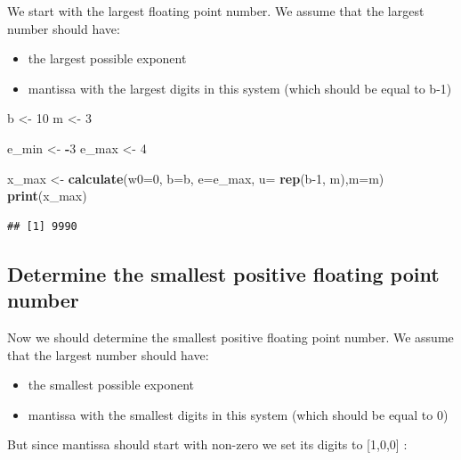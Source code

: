 \documentclass[
]{article}
\newenvironment{Shaded}{\begin{snugshade}}{\end{snugshade}}
\newcommand{\AttributeTok}[1]{\textcolor[rgb]{0.13,0.29,0.53}{#1}}
\newcommand{\DecValTok}[1]{\textcolor[rgb]{0.00,0.00,0.81}{#1}}
\newcommand{\FunctionTok}[1]{\textcolor[rgb]{0.13,0.29,0.53}{\textbf{#1}}}
\newcommand{\NormalTok}[1]{#1}
\newcommand{\OtherTok}[1]{\textcolor[rgb]{0.56,0.35,0.01}{#1}}
\newcommand{\SpecialCharTok}[1]{\textcolor[rgb]{0.81,0.36,0.00}{\textbf{#1}}}
\providecommand{\tightlist}{%
  \setlength{\itemsep}{0pt}\setlength{\parskip}{0pt}}
\begin{document}
We start with the largest floating point number. We assume that the
largest number should have:

\begin{itemize}
\tightlist
\item
  the largest possible exponent
\item
  mantissa with the largest digits in this system (which should be equal
  to b-1)
\end{itemize}

\begin{Shaded}
\begin{Highlighting}[]
\NormalTok{b }\OtherTok{\textless{}{-}} \DecValTok{10}  
\NormalTok{m }\OtherTok{\textless{}{-}} \DecValTok{3}

\NormalTok{e\_min }\OtherTok{\textless{}{-}} \SpecialCharTok{{-}}\DecValTok{3}  
\NormalTok{e\_max }\OtherTok{\textless{}{-}} \DecValTok{4}


\NormalTok{x\_max }\OtherTok{\textless{}{-}} \FunctionTok{calculate}\NormalTok{(}\AttributeTok{w0=}\DecValTok{0}\NormalTok{, }\AttributeTok{b=}\NormalTok{b, }\AttributeTok{e=}\NormalTok{e\_max, }\AttributeTok{u=} \FunctionTok{rep}\NormalTok{(b}\DecValTok{{-}1}\NormalTok{, m),}\AttributeTok{m=}\NormalTok{m)}
\FunctionTok{print}\NormalTok{(x\_max)}
\end{Highlighting}
\end{Shaded}

\begin{verbatim}
## [1] 9990
\end{verbatim}

\subsection{Determine the smallest positive floating point
number}\label{determine-the-smallest-positive-floating-point-number}

Now we should determine the smallest positive floating point number. We
assume that the largest number should have:

\begin{itemize}
\tightlist
\item
  the smallest possible exponent
\item
  mantissa with the smallest digits in this system (which should be
  equal to 0)
\end{itemize}

But since mantissa should start with non-zero we set its digits to
{[}1,0,0{]} :
\end{document}
